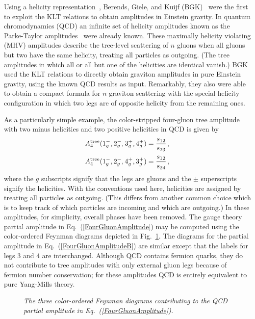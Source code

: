 Using a helicity representation~\cite{Causmaecker81,Kleiss85,Xu87},
Berends, Giele, and Kuijf (BGK)~\cite{BGK} were the first to exploit
the KLT relations to obtain amplitudes in Einstein gravity.  In
quantum chromodynamics (QCD) an infinite set of helicity amplitudes
known as the Parke-Taylor
amplitudes~\cite{ParkeTaylor86,BerendsGiele88,Kosower90LightCone} were
already known.  These maximally helicity violating (MHV) amplitudes
describe the tree-level scattering of $n$ gluons when all gluons but
two have the same helicity, treating all particles as outgoing.  (The
tree amplitudes in which all or all but one of the helicities are
identical vanish.)  BGK used the KLT relations to directly obtain
graviton amplitudes in pure Einstein gravity, using the known QCD
results as input.  Remarkably, they also were able to obtain a compact
formula for $n$-graviton scattering with the special helicity
configuration in which two legs are of opposite helicity from the
remaining ones.


As a particularly simple example, the color-stripped four-gluon tree 
amplitude with two minus helicities and two positive helicities
in QCD is given by
%
\begin{equation}
A_4^{\rm tree}(1^-_g, 2^-_g, 3^+_g, 4^+_g) =  {s_{12} \over s_{23}} \,,
\label{FourGluonAmplitude}
\end{equation}
%
\begin{equation}
A_4^{\rm tree}(1^-_g, 2^-_g, 4^+_g, 3^+_g) =  {s_{12} \over s_{24}} \,,
\label{FourGluonAmplitudeB}
\end{equation}
%
where the $g$ subscripts signify that the legs are gluons and the
$\pm$ superscripts signify the helicities.  With the conventions used
here, helicities are assigned by treating all particles as
outgoing.  (This differs from another common choice which is to keep
track of which particles are incoming and which are outgoing.)  In
these amplitudes, for simplicity, overall phases have been  removed.  The
gauge theory partial amplitude in Eq.~(\ref{FourGluonAmplitude}) may
be computed using the color-ordered Feynman diagrams depicted in
Fig.~\ref{figure:Gluon}.  The diagrams for the partial amplitude in
Eq.~(\ref{FourGluonAmplitudeB}) are similar except that the labels for
legs 3 and 4 are interchanged. Although QCD contains fermion quarks,
they do not contribute to tree amplitudes with only external gluon legs
because of fermion number conservation; for these amplitudes QCD is
entirely equivalent to pure Yang-Mills theory.


\begin{figure}[h]
  \def\epsfsize#1#2{0.9#1} \centerline{}
  \caption{\it The three color-ordered Feynman diagrams contributing to 
         the QCD partial amplitude in Eq.~(\ref{FourGluonAmplitude}).}
  \label{figure:Gluon}
\end{figure}

